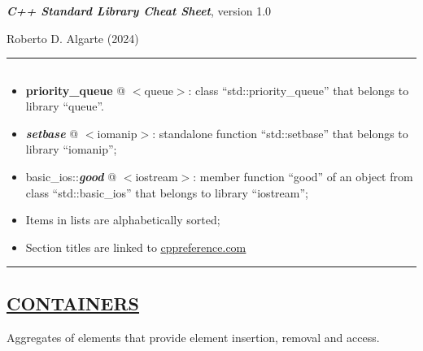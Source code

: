 \documentclass[10pt]{article}
\begin{document}
\noindent
{\large{\textbf{\emph{C++ Standard Library Cheat Sheet}}, {\small version 1.0}}	
}

\noindent
{\small  Roberto D. Algarte (2024)}
\par\noindent\rule{\linewidth}{0.4pt}

\scriptsize
\begin{multicols*}{5}

{\color{Blue}
\subsection*{}	

\begin{itemize}[leftmargin=*,topsep=0.25pt]
  \setlength\itemsep{-1.8pt}
	\item \textbf{priority\_queue} @ $<$queue$>$: class ``std::pri\-ori\-ty\_que\-ue'' that belongs to library ``queue''. 
	\item \emph{\textbf{setbase}} @ $<$iomanip$>$: standalone function ``std::setbase'' that belongs to library ``iomanip'';
	\item basic\_ios::\emph{\textbf{good}} @ $<$iostream$>$: member function ``good'' of an object from class ``std::basic\_ios'' that belongs to library ``iostream''; 
	\item Items in lists are alphabetically sorted; 
	\item Section titles are linked to \href{https://en.cppreference.com}{\underline{cppreference.com}} 
\end{itemize}

\par\noindent\rule{155pt}{0.4pt}

}

{\color{Blue}
\subsection*{\href{https://en.cppreference.com/w/cpp/container}{\underline{CONTAINERS}}}	
\noindent
Aggregates of elements that provide element insertion, removal and access.

}
\end{multicols*}
\end{document}
